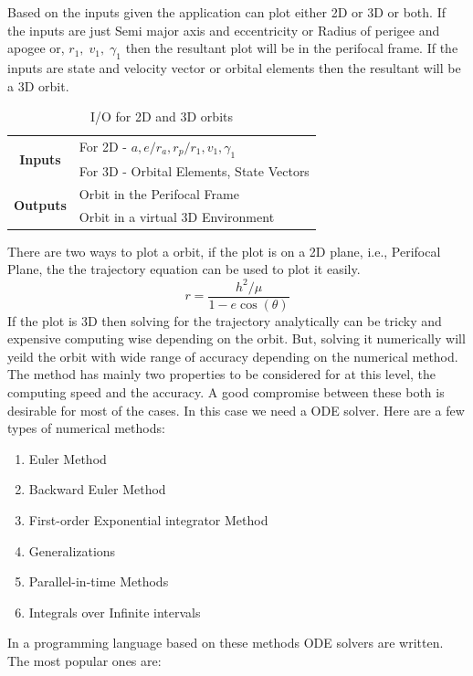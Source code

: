 Based on the inputs given the application can plot either 2D or 3D or both. If the inputs are just Semi major axis and eccentricity or Radius of perigee and apogee or, $r_1,\;v_1,\;\gamma_1$ then the resultant plot will be in the perifocal frame. If the inputs are state and velocity vector or orbital elements then the resultant will be a 3D orbit. 
\begin{table}[H]
\centering
\begin{tabular}{@{}cl@{}}
\toprule
\multirow{2}{*}{\textbf{Inputs}}                      & For 2D - $a,e/r_a,r_p/ r_1, v_1, \gamma_1$ \\ \cmidrule(l){2-2} 
                                             & For 3D - Orbital Elements, State Vectors   \\ \midrule
\multicolumn{1}{r}{\multirow{2}{*}{\textbf{Outputs}}} & Orbit in the Perifocal Frame               \\ \cmidrule(l){2-2} 
\multicolumn{1}{r}{}                         & Orbit in a virtual 3D Environment          \\ \bottomrule
\end{tabular}
\caption{I/O for 2D and 3D orbits}
\label{o23}
\end{table}
There are two ways to plot a orbit, if the plot is on a 2D plane, i.e., Perifocal Plane, the the trajectory equation can be used to plot it easily.
$$r=\dfrac{h^2/\mu}{1 - e\cos(\theta)}$$
If the plot is 3D then solving for the trajectory analytically can be tricky and expensive computing wise depending on the orbit. But, solving it numerically will yeild the orbit with wide range of accuracy depending on the numerical method. The method has mainly two properties to be considered for at this level, the computing speed and the accuracy. A good compromise between these both is desirable for most of the cases. In this case we need a ODE solver. Here are a few types of numerical methods:
\begin{enumerate}
\item Euler Method
\item Backward Euler Method
\item First-order Exponential integrator Method
\item Generalizations
\item Parallel-in-time Methods
\item Integrals over Infinite intervals
\end{enumerate} 
In a programming language based on these methods ODE solvers are written. The most popular ones are:
